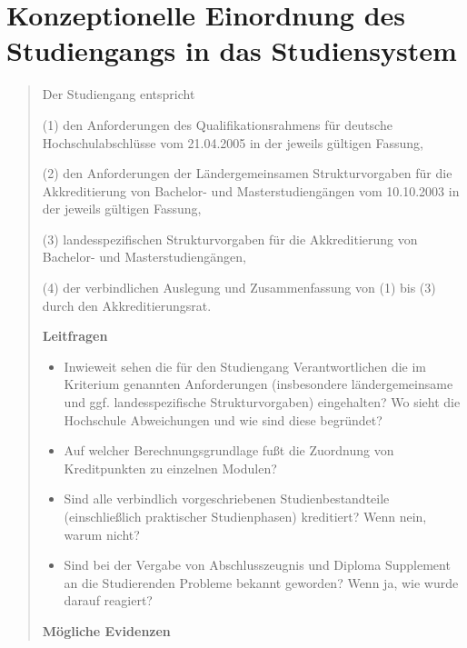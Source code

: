 \chapter{Konzeptionelle Einordnung des Studiengangs in das
Studiensystem}\label{konzeptionelle-einordnung-des-studiengangs-in-das-studiensystem}

\begin{quote}
Der Studiengang entspricht

(1) den Anforderungen des Qualifikationsrahmens für deutsche
Hochschulabschlüsse vom 21.04.2005 in der jeweils gültigen Fassung,

(2) den Anforderungen der Ländergemeinsamen Strukturvorgaben für die
Akkreditierung von Bachelor- und Masterstudiengängen vom 10.10.2003 in
der jeweils gültigen Fassung,

(3) landesspezifischen Strukturvorgaben für die Akkreditierung von
Bachelor- und Masterstudiengängen,

(4) der verbindlichen Auslegung und Zusammenfassung von (1) bis (3)
durch den Akkreditierungsrat.

\textbf{Leitfragen}

\begin{itemize}
\item
  Inwieweit sehen die für den Studiengang Verantwortlichen die im
  Kriterium genannten Anforderungen (insbesondere ländergemeinsame und
  ggf. landesspezifische Strukturvorgaben) eingehalten? Wo sieht die
  Hochschule Abweichungen und wie sind diese begründet?
\item
  Auf welcher Berechnungsgrundlage fußt die Zuordnung von Kreditpunkten
  zu einzelnen Modulen?
\item
  Sind alle verbindlich vorgeschriebenen Studienbestandteile
  (einschließlich praktischer Studienphasen) kreditiert? Wenn nein,
  warum nicht?
\item
  Sind bei der Vergabe von Abschlusszeugnis und Diploma Supplement an
  die Studierenden Probleme bekannt geworden? Wenn ja, wie wurde darauf
  reagiert?
\end{itemize}

\textbf{Mögliche Evidenzen}


\end{quote}
